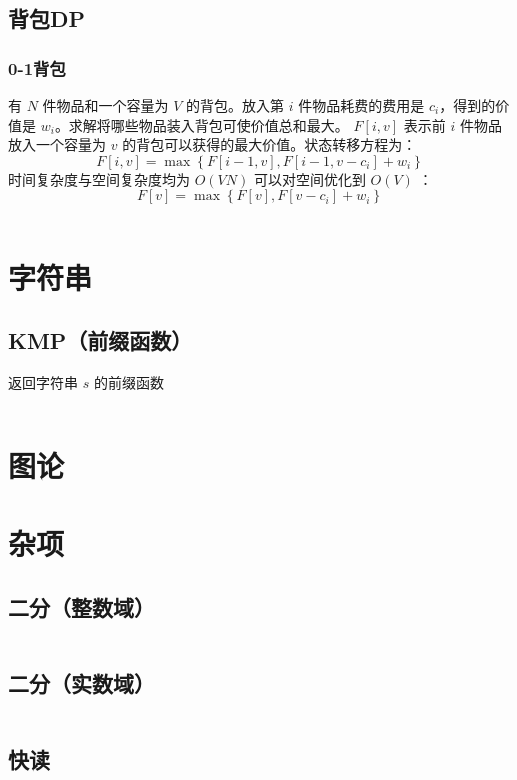 \documentclass[a4paper, twoside]{article}
\begin{document}
    \subsection{背包DP}
    \subsubsection{0-1背包}
    有 $N$ 件物品和一个容量为 $V$ 的背包。放入第 $i$ 件物品耗费的费用是 $c_i$，得到的价值是 $w_i$。求解将哪些物品装入背包可使价值总和最大。
    $F[i, v]$ 表示前 $i$ 件物品放入一个容量为 $v$ 的背包可以获得的最大价值。状态转移方程为：
    $$F[i, v]=\max\left\{F[i-1, v], F[i-1, v-c_i]+ w_i\right\}$$
    时间复杂度与空间复杂度均为 $O(VN)$ 可以对空间优化到 $O(V)$ ：
    $$F[v]=\max\left\{F[v], F[v-c_i]+w_i\right\}$$
    \inputminted{cpp}{../src/动态规划/0-1背包.cpp}

\newpage
    \section{字符串}
    \subsection{KMP（前缀函数）}
    返回字符串 $s$ 的前缀函数
    \inputminted{cpp}{../src/字符串/KMP（前缀函数）.cpp}

\newpage
\section{图论}

\newpage
\section{杂项}
    \subsection{二分（整数域）}
    \inputminted{cpp}{../src/杂项/二分（整数域）.cpp}

    \subsection{二分（实数域）}
    \inputminted{cpp}{../src/杂项/二分（实数域）.cpp}

    \subsection{快读}
    \inputminted{cpp}{../src/杂项/快读.cpp}
\end{document}
